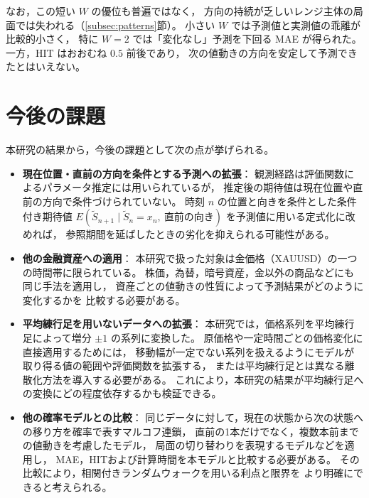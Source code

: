 \documentclass[a4j,dvipdfmx]{jsarticle}
\theoremstyle{plainnote}
\begin{document}
なお，この短い $W$ の優位も普遍ではなく，
方向の持続が乏しいレンジ主体の局面では失われる（\ref{subsec:patterns}節）。
小さい $W$ では予測値と実測値の乖離が比較的小さく，
特に $W=2$ では「変化なし」予測を下回る MAE が得られた。
一方，HIT はおおむね $0.5$ 前後であり，
次の値動きの方向を安定して予測できたとはいえない。
\newpage
\section{今後の課題}

本研究の結果から，今後の課題として次の点が挙げられる。

\begin{itemize}
  \item \textbf{現在位置・直前の方向を条件とする予測への拡張}：
        観測経路は評価関数によるパラメータ推定には用いられているが，
        推定後の期待値は現在位置や直前の方向で条件づけられていない。
        時刻 $n$ の位置と向きを条件とした条件付き期待値
        $E(\tilde{S}_{n+1}\mid \tilde{S}_n=x_n,\ \text{直前の向き})$
        を予測値に用いる定式化に改めれば，
        参照期間を延ばしたときの劣化を抑えられる可能性がある。

  \item \textbf{他の金融資産への適用}：
        本研究で扱った対象は金価格（XAUUSD）の一つの時間帯に限られている。
        株価，為替，暗号資産，金以外の商品などにも同じ手法を適用し，
        資産ごとの値動きの性質によって予測結果がどのように変化するかを
        比較する必要がある。

  \item \textbf{平均練行足を用いないデータへの拡張}：
        本研究では，価格系列を平均練行足によって増分 $\pm1$ の系列に変換した。
        原価格や一定時間ごとの価格変化に直接適用するためには，
        移動幅が一定でない系列を扱えるようにモデルが取り得る値の範囲や評価関数を拡張する，
        または平均練行足とは異なる離散化方法を導入する必要がある。
        これにより，本研究の結果が平均練行足への変換にどの程度依存するかも検証できる。

  \item \textbf{他の確率モデルとの比較}：
        同じデータに対して，現在の状態から次の状態への移り方を確率で表すマルコフ連鎖，
        直前の1本だけでなく，複数本前までの値動きを考慮したモデル，
        局面の切り替わりを表現するモデルなどを適用し，
        MAE，HITおよび計算時間を本モデルと比較する必要がある。
        その比較により，相関付きランダムウォークを用いる利点と限界を
        より明確にできると考えられる。

\end{itemize}
\end{document}
